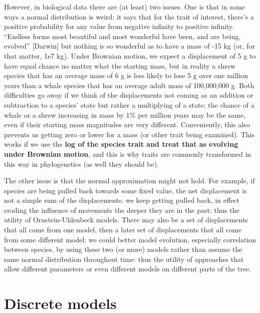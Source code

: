 \documentclass[]{book}
\theoremstyle{definition}
\theoremstyle{definition}
\theoremstyle{remark}
\begin{document}
However, in biological data there are (at least) two issues. One is that
in some ways a normal distribution is weird: it says that for the trait
of interest, there's a positive probability for any value from negative
infinity to positive infinity. ``Endless forms most beautiful and most
wonderful have been, and are being, evolved'' {[}Darwin{]} but nothing
is so wonderful as to have a mass of -15 kg (or, for that matter, 1e7
kg). Under Brownian motion, we expect a displacement of 5 g to have
equal chance no matter what the starting mass, but in reality a shrew
species that has an average mass of 6 g is less likely to lose 5 g over
one million years than a whale species that has an average adult mass of
100,000,000 g. Both difficulties go away if we think of the
displacements not coming as an addition or subtraction to a species'
state but rather a multiplying of a state: the chance of a whale or a
shrew increasing in mass by 1\% per million years may be the same, even
if their starting mass magnitudes are very different. Conveniently, this
also prevents us getting zero or lower for a mass (or other trait being
examined). This works if we use the \textbf{log of the species trait and
treat that as evolving under Brownian motion}, and this is why traits
are commonly transformed in this way in phylogenetics (as well they
should be).

The other issue is that the normal approximation might not hold. For
example, if species are being pulled back towards some fixed value, the
net displacement is not a simple sum of the displacements: we keep
getting pulled back, in effect eroding the influence of movements the
deeper they are in the past: thus the utility of Ornstein-Uhlenbeck
models. There may also be a set of displacements that all come from one
model, then a later set of displacements that all come from some
different model: we could better model evolution, especially correlation
between species, by using these two (or more) models rather than assume
the same normal distribution throughout time: thus the utility of
approaches that allow different parameters or even different models on
different parts of the tree.

\section{Discrete models}\label{discrete-models}
\end{document}
